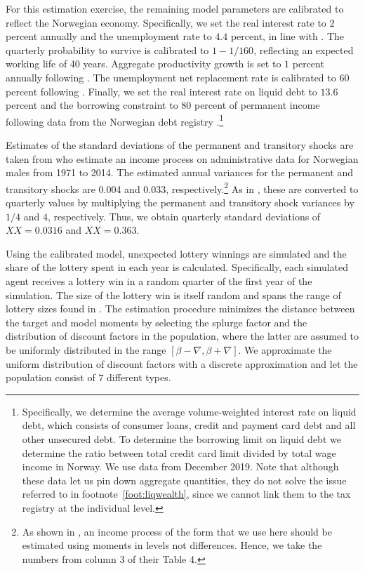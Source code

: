 \documentclass[11pt]{article}
\begin{document}
For this estimation exercise, the remaining model parameters are calibrated to reflect the Norwegian economy. Specifically, we set the real interest rate to $2$ percent annually and the unemployment rate to $4.4$ percent, in line with \citet{aursland_state-dependent_2020}. The quarterly probability to survive is calibrated to $1-1/160$, reflecting an expected working life of 40 years. Aggregate productivity growth is set to $1$ percent annually following \citet{kravik_navigating_2019}. The unemployment net replacement rate is calibrated to $60$ percent following \citet{oecd_net_2020}. Finally, we set the real interest rate on liquid debt to $13.6$ percent and the borrowing constraint to $80$ percent of permanent income following data from the Norwegian debt registry \citet{gjeldsregistret_nokkeltall_2022}.\footnote{Specifically, we determine the average volume-weighted interest rate on liquid debt, which consists of consumer loans, credit and payment card debt and all other unsecured debt. To determine the borrowing limit on liquid debt we determine the ratio between total credit card limit divided by total wage income in Norway. We use data from December 2019. Note that although these data let us pin down aggregate quantities, they do not solve the issue referred to in footnote~\ref{foot:liqwealth}, since we cannot link them to the tax registry at the individual level.}

Estimates of the standard deviations of the permanent and transitory shocks are taken from \citet{crawley2022parsimonious} who estimate an income process on administrative data for Norwegian males from 1971 to 2014. The estimated annual variances for the permanent and transitory shocks are 0.004 and 0.033, respectively.\footnote{As shown in \citet{crawley2022parsimonious}, an income process of the form that we use here should be estimated using moments in levels not differences. Hence, we take the numbers from column 3 of their Table 4.} As in \citet{carroll2020sticky}, these are converted to quarterly values by multiplying the permanent and transitory shock variances by $1/4$ and $4$, respectively. Thus, we obtain quarterly standard deviations of $XX=0.0316$ and $XX=0.363$.

Using the calibrated model, unexpected lottery winnings are simulated and the share of the lottery spent in each year is calculated. Specifically, each simulated agent receives a lottery win in a random quarter of the first year of the simulation. The size of the lottery win is itself random and spans the range of lottery sizes found in \citet{fagereng_mpc_2021}. The estimation procedure minimizes the distance between the target and model moments by selecting the splurge factor and the distribution of discount factors in the population, where the latter are assumed to be uniformly distributed in the range $[\beta-\nabla, \beta+\nabla]$. We approximate the uniform distribution of discount factors with a discrete approximation and let the population consist of $7$ different types.
\end{document}
